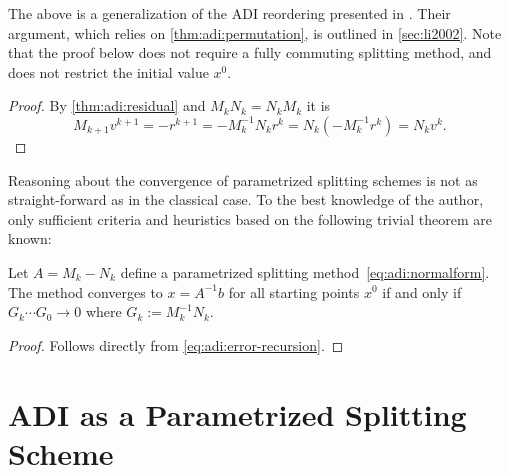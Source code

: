 \begin{remark}
  The above is a generalization of the \ac{ADI} reordering presented in \cite[Section~4]{Li2002}.
  Their argument,
  which relies on \autoref{thm:adi:permutation},
  is outlined in \autoref{sec:li2002}.
  Note that the proof below does not require a fully commuting splitting method,
  and does not restrict the initial value $x^0$.
\end{remark}

\begin{proof}
  By \autoref{thm:adi:residual} and $M_k N_k = N_k M_k$ it is
  \begin{equation*}
    M_{k+1} v^{k+1}
    = - r^{k+1}
    = - M_k^{-1} N_k r^k
    = N_k (- M_k^{-1} r^k)
    = N_k v^k
    .
  \end{equation*}
\end{proof}

Reasoning about the convergence of parametrized splitting schemes is not as straight-forward as in the classical case.
To the best knowledge of the author,
only sufficient criteria and heuristics based on the following trivial theorem are known:

\begin{theorem}
\label{thm:adi:convergence}
  Let $A = M_k - N_k$ define a parametrized splitting method~\eqref{eq:adi:normalform}.
  The method converges to $x = A^{-1} b$ for all starting points $x^0$
  if and only if $G_k \cdots G_0 \to 0$ where $G_k := M_k^{-1} N_k$.
\end{theorem}
\begin{proof}
  Follows directly from \eqref{eq:adi:error-recursion}.
\end{proof}

\section{ADI as a Parametrized Splitting Scheme}
\label{sec:adi:1step}

